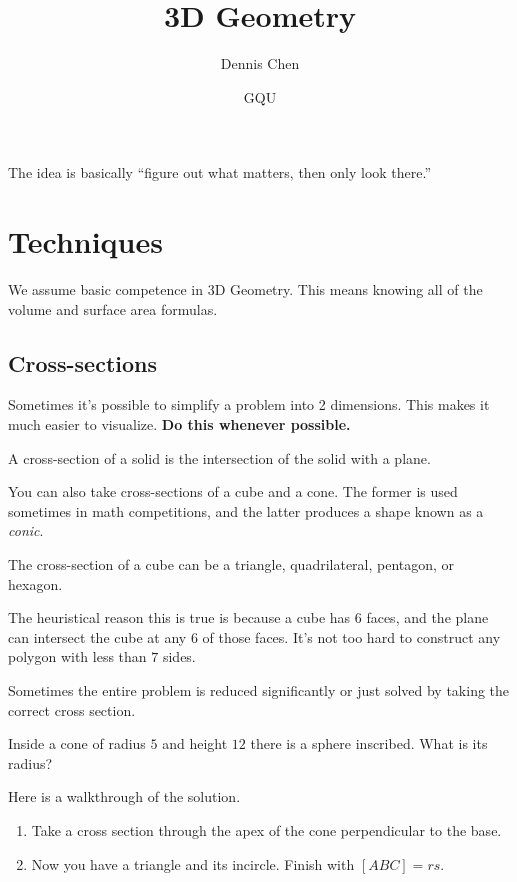 \documentclass[mast]{lucky}
\title{3D Geometry}
\author{Dennis Chen}
\date{GQU}
\begin{document}
\maketitle

The idea is basically “figure out what matters, then only look there.”
\section{Techniques}
We assume basic competence in 3D Geometry. This means knowing all of the volume and surface area formulas.

\subsection{Cross-sections}
Sometimes it's possible to simplify a problem into 2 dimensions. This makes it much easier to visualize. \textbf{Do this whenever possible.}

\begin{defi}
A cross-section of a solid is the intersection of the solid with a plane.
\end{defi}

You can also take cross-sections of a cube and a cone. The former is used sometimes in math competitions, and the latter produces a shape known as a \textit{conic}.

\begin{theo}
The cross-section of a cube can be a triangle, quadrilateral, pentagon, or hexagon.
\end{theo}

The heuristical reason this is true is because a cube has $6$ faces, and the plane can intersect the cube at any $6$ of those faces. It's not too hard to construct any polygon with less than $7$ sides.

Sometimes the entire problem is reduced significantly or just solved by taking the correct cross section.

\begin{exam}
Inside a cone of radius $5$ and height $12$ there is a sphere inscribed. What is its radius?
\end{exam}
\begin{sol}
Here is a walkthrough of the solution.
\begin{enumerate}
    \item Take a cross section through the apex of the cone perpendicular to the base.
    
    \item Now you have a triangle and its incircle. Finish with $[ABC]=rs.$
\end{enumerate}
\end{sol}
\end{document}

